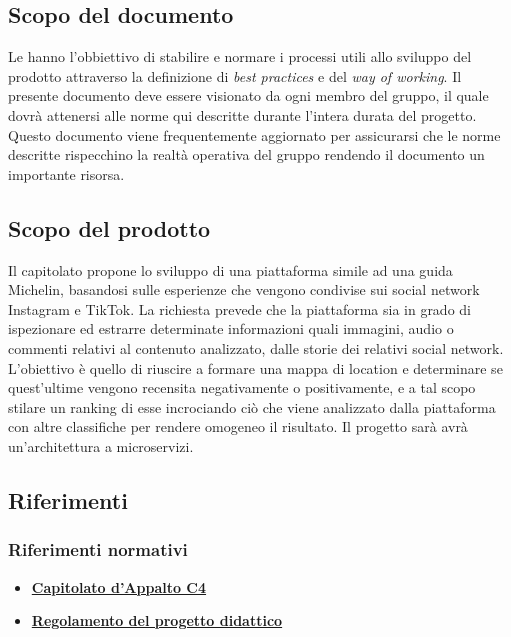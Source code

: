 \subsection{Scopo del documento}
Le \NdP{} hanno l'obbiettivo di stabilire e normare i processi utili allo sviluppo del prodotto attraverso la definizione di \emph{best practices} e del \emph{way of working}.
Il presente documento deve essere visionato da ogni membro del gruppo, il quale dovrà attenersi alle norme qui descritte durante l'intera durata del progetto.
Questo documento viene frequentemente aggiornato per assicurarsi che le norme descritte rispecchino la realtà operativa del gruppo rendendo il documento un importante risorsa.
\subsection{Scopo del prodotto}
Il capitolato propone lo sviluppo di una piattaforma simile ad una guida Michelin, basandosi sulle esperienze che vengono condivise sui social network Instagram e TikTok.
La richiesta prevede che la piattaforma sia in grado di ispezionare ed estrarre determinate informazioni quali immagini, audio o commenti relativi al contenuto analizzato, dalle storie dei relativi social network.
L'obiettivo è quello di riuscire a formare una mappa di location e determinare se quest'ultime vengono recensita negativamente o positivamente, e a tal scopo stilare un ranking di esse incrociando ciò che viene analizzato dalla piattaforma con altre classifiche per rendere omogeneo il risultato.
Il progetto sarà avrà un'architettura a microservizi.
\subsection{Riferimenti} %
\subsubsection{Riferimenti normativi}
\begin{itemize}
	\item
	\href{https://www.math.unipd.it/~tullio/IS-1/2021/Progetto/C4p.pdf}{\textbf{Capitolato d'Appalto C4}}
	\item
	\href{https://www.math.unipd.it/~tullio/IS-1/2021/Dispense/PD2.pdf}{\textbf{Regolamento del progetto didattico}}
\end{itemize}

